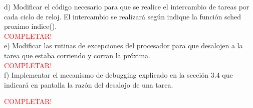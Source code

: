 \documentclass[a4paper]{article}
\begin{document}
{\large d)} Modificar el c\'odigo necesario para que se realice el intercambio de tareas por cada ciclo de
reloj. El intercambio se realizar\'a seg\'un indique la funci\'on sched proximo \'indice().\\


\textcolor{red}{COMPLETAR!}\\


{\large e)} Modificar las rutinas de excepciones del procesador para que desalojen a la tarea que
estaba corriendo y corran la pr\'oxima.\\

\textcolor{red}{COMPLETAR!}\\

{\large f)} Implementar el mecanismo de debugging explicado en la secci\'on 3.4 que indicar\'a en pantalla
la raz\'on del desalojo de una tarea.


\textcolor{red}{COMPLETAR!}\\
\end{document}
